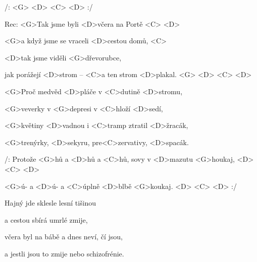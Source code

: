 

/: <G> <D> <C> <D> :/

Rec: <G>Tak jsme byli <D>včera na Portě <C> <D>

<G>a když jsme se vraceli <D>cestou domů, <C>

<D>tak jsme viděli <G>dřevorubce,

jak porážejí <D>strom -- <C>a ten strom <D>plakal. <G> <D> <C> <D>

\zs
<G>Proč medvěd <D>pláče v <C>dutině <D>stromu,

<G>veverky v <G>depresi v <C>hloží <D>sedí,

<G>květiny <D>vadnou i <C>tramp ztratil <D>žracák,

<G>trenýrky, <D>sekyru, pre<C>zervativy, <D>spacák.
\ks

\zr
/: Protože <G>hů a <D>hů a <C>hů, sovy v <D>mazutu <G>houkaj, <D> <C> <D>

<G>ú- a <D>ú- a <C>úplně <D>blbě <G>koukaj. <D> <C> <D> :/
\kr

\zs
Hajný jde sklesle lesní tišinou

a cestou sbírá umrlé zmije,

včera byl na bábě a dnes neví, čí jsou,

a jestli jsou to zmije nebo schizofrénie.
\ks

\zr \kr

\kp






















